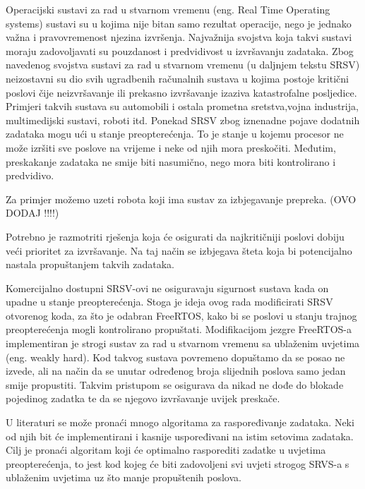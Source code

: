 \documentclass[../zavrsni.tex]{subfiles}
\begin{document}
Operacijski sustavi za rad u stvarnom vremenu (eng. Real Time Operating systems) sustavi su u kojima nije bitan samo
rezultat operacije, nego je jednako važna i pravovremenost njezina izvršenja. Najvažnija svojstva koja takvi sustavi moraju
zadovoljavati su pouzdanost i predvidivost u izvršavanju zadataka.
Zbog navedenog svojstva sustavi za rad u stvarnom vremenu (u daljnjem tekstu SRSV) neizostavni su dio svih ugradbenih 
računalnih sustava u kojima postoje kritični poslovi čije neizvršavanje ili prekasno izvršavanje izaziva katastrofalne
posljedice. Primjeri takvih sustava su automobili i ostala prometna sretstva,vojna industrija, multimedijski sustavi, roboti itd. 
Ponekad SRSV zbog iznenadne pojave dodatnih zadataka mogu ući u stanje preopterećenja. To je stanje u kojemu procesor ne može 
izršiti sve poslove na vrijeme i neke od njih mora preskočiti. Međutim, preskakanje zadataka ne smije biti nasumično, nego
mora biti kontrolirano i predvidivo. 

Za primjer možemo uzeti robota koji ima sustav za izbjegavanje prepreka. (OVO DODAJ !!!!)

Potrebno je razmotriti rješenja koja će osigurati da najkritičniji poslovi dobiju veći prioritet za izvršavanje. 
Na taj način se izbjegava šteta koja bi potencijalno nastala propuštanjem takvih zadataka. 

Komercijalno dostupni SRSV-ovi ne osiguravaju sigurnost sustava kada on upadne u stanje preopterećenja. Stoga je ideja ovog rada 
modificirati SRSV otvorenog koda, za što je odabran FreeRTOS, kako bi se poslovi u stanju trajnog preopterećenja mogli kontrolirano propuštati. 
Modifikacijom jezgre FreeRTOS-a implementiran je strogi sustav za rad u stvarnom vremenu sa ublaženim uvjetima (eng. weakly hard). Kod takvog sustava
povremeno dopuštamo da se posao ne izvede, ali na način da se unutar određenog broja slijednih poslova samo jedan smije propustiti.
Takvim pristupom se osigurava da nikad ne dođe do blokade pojedinog zadatka te da se njegovo izvršavanje uvijek preskače.

U literaturi se može pronaći mnogo algoritama za raspoređivanje zadataka. Neki od njih bit će implementirani i kasnije uspoređivani na istim
setovima zadataka. Cilj je pronaći algoritam koji će optimalno rasporediti zadatke u uvjetima preopterećenja, to jest kod kojeg će biti 
zadovoljeni svi uvjeti strogog SRVS-a s ublaženim uvjetima uz što manje propuštenih poslova. 
\end{document}
